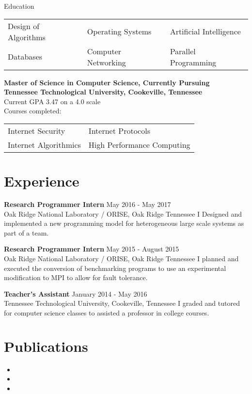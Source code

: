 \documentclass[10pt]{res}
\newcommand{\job}[5]{
    {\bf #1} \hfill #2 \\
    #3 #4
    #5
}
\begin{document}
\begin{resume}
\begin{section}{Education}
    \vspace{-0.15in}
    \begin{tabularx}{\textwidth}{l l l}
        Design of Algorithms & Operating Systems & Artificial Intelligence \\
        Databases & Computer Networking & Parallel Programming \\
    \end{tabularx}

    {\bf Master of Science in Computer Science, Currently Pursuing\\
    Tennessee Technological University, Cookeville, Tennessee} \\
    Current GPA 3.47 on a 4.0 scale \\
    Courses completed:

    \vspace{-0.15in}
    \begin{tabularx}{\textwidth}{l l}
        Internet Security & Internet Protocols \\
        Internet Algorithmics & High Performance Computing \\
    \end{tabularx}
\end{section}

\section{Experience}
\job{Research Programmer Intern} {May 2016 - May 2017} {Oak Ridge National Laboratory / ORISE, Oak Ridge Tennessee}
{
I Designed and implemented a new programming model for 
heterogeneous large scale systems as part of a team.
}

\job{Research Programmer Intern} {May 2015 - August 2015}
{Oak Ridge National Laboratory / ORISE, Oak Ridge Tennessee}
{
I planned and executed the conversion of benchmarking 
programs to use an experimental
modification to MPI to allow for fault tolerance.
}

\job{Teacher's Assistant} {January 2014 - May 2016}
{Tennessee Technological University, Cookeville, Tennessee}
{
I graded and tutored for computer science classes to assisted a 
professor in college courses.
}

\section{Publications}
\begin{itemize}
    \item {}
    \item {}
    \item {}
\end{itemize}


\end{resume}
\end{document}
